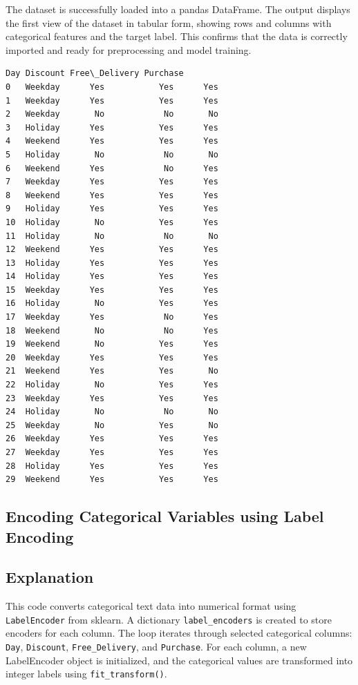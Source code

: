 \documentclass[11pt,a4paper]{report}
\makeatletter
\newcommand{\boxspacing}{\kern\kvtcb@left@rule\kern\kvtcb@boxsep}
\newcommand{\prompt}[4]{
        {\ttfamily\llap{{\color{#2}[#3]:\hspace{3pt}#4}}\vspace{-\baselineskip}}
    }
\makeatother
\begin{document}
The dataset is successfully loaded into a pandas DataFrame. The output displays the first view of the dataset in tabular form, showing rows and columns with categorical features and the target label. This confirms that the data is correctly imported and ready for preprocessing and model training.

\begin{tcolorbox}[breakable, size=fbox, boxrule=.5pt, pad at break*=1mm, opacityfill=0]
\prompt{Out}{outcolor}{3}{\boxspacing}
\begin{Verbatim}[commandchars=\\\{\}]
        Day Discount Free\_Delivery Purchase
0   Weekday      Yes           Yes      Yes
1   Weekday      Yes           Yes      Yes
2   Weekday       No            No       No
3   Holiday      Yes           Yes      Yes
4   Weekend      Yes           Yes      Yes
5   Holiday       No            No       No
6   Weekend      Yes            No      Yes
7   Weekday      Yes           Yes      Yes
8   Weekend      Yes           Yes      Yes
9   Holiday      Yes           Yes      Yes
10  Holiday       No           Yes      Yes
11  Holiday       No            No       No
12  Weekend      Yes           Yes      Yes
13  Holiday      Yes           Yes      Yes
14  Holiday      Yes           Yes      Yes
15  Weekday      Yes           Yes      Yes
16  Holiday       No           Yes      Yes
17  Weekday      Yes            No      Yes
18  Weekend       No            No      Yes
19  Weekend       No           Yes      Yes
20  Weekday      Yes           Yes      Yes
21  Weekend      Yes           Yes       No
22  Holiday       No           Yes      Yes
23  Weekday      Yes           Yes      Yes
24  Holiday       No            No       No
25  Weekday       No           Yes       No
26  Weekday      Yes           Yes      Yes
27  Weekday      Yes           Yes      Yes
28  Holiday      Yes           Yes      Yes
29  Weekend      Yes           Yes      Yes
\end{Verbatim}
\end{tcolorbox}
        

\subsection{Encoding Categorical Variables using Label Encoding}

\subsection*{Explanation}
This code converts categorical text data into numerical format using \texttt{LabelEncoder} from sklearn. A dictionary \texttt{label\_encoders} is created to store encoders for each column. The loop iterates through selected categorical columns: \texttt{Day}, \texttt{Discount}, \texttt{Free\_Delivery}, and \texttt{Purchase}. For each column, a new LabelEncoder object is initialized, and the categorical values are transformed into integer labels using \texttt{fit\_transform()}.
        
\end{document}

